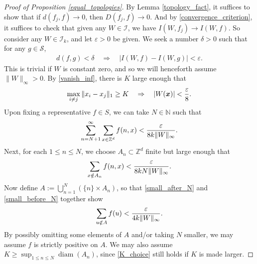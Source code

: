 \documentclass[11pt,reqno]{amsart}
\numberwithin{equation}{section}
\theoremstyle{definition}
\begin{document}
\begin{proof}[Proof of Proposition \ref{equal_topologies}]
By Lemma \ref{topology_fact}, it suffices to show that if $d(f_j,f) \to 0$, then $D(f_j,f) \to 0$.
And by \eqref{convergence_criterion}, it suffices to check that given any $W \in {\mathcal{I}}$, we have
$I(W,f_j) \to I(W,f)$.
So consider any $W \in {\mathcal{I}}_k$, and let ${\varepsilon} > 0$ be given.
We seek a number $\delta > 0$ such that for any $g \in {\mathcal{S}}$,
{\begin{align*} {
d(f,g) < \delta \quad \Rightarrow \quad |I(W,f) - I(W,g)| < {\varepsilon}. 
} \end{align*}}
This is trivial if $W$ is constant zero, and so we will henceforth assume $\|W\|_\infty > 0$.
By \eqref{vanish_inf}, there is $K$ large enough that
{\begin{align} \begin{split} { \label{K_choice}
\max_{i \neq j} \|x_i - x_j\|_1 \geq K \quad \Rightarrow \quad |W({{\boldsymbol {x}}})| < \frac{\varepsilon}{8}.
} \end{split} \end{align}}
Upon fixing a representative $f \in S$, we can take $N \in {\mathbb{N}}$ such that
{\begin{align} \begin{split} { \label{small_after_N}
\sum_{n = N+1}^\infty \sum_{x \in {\mathbb{Z}}^d} f(n,x) < \frac{\varepsilon}{8k\|W\|_\infty}.
} \end{split} \end{align}} 
Next, for each $1 \leq n \leq N$, we choose $A_n \subset {\mathbb{Z}}^d$ finite but large enough that
{\begin{align} \begin{split} { \label{small_before_N}
\sum_{x \notin A_n} f(n,x) < \frac{\varepsilon}{8kN\|W\|_\infty}.
} \end{split} \end{align}}
Now define $A := \bigcup_{n = 1}^N (\{n\} \times A_n)$, so that \eqref{small_after_N} and \eqref{small_before_N} together show
{\begin{align} \begin{split} { \label{small_total}
\sum_{u \notin A} f(u) < \frac{\varepsilon}{4k\|W\|_\infty}.
} \end{split} \end{align}}
By possibly omitting some elements of $A$ and/or taking $N$ smaller, we may assume $f$ is strictly positive on $A$.
We may also assume $K \geq \sup_{1 \leq n \leq N} \operatorname{diam}(A_n)$, since \eqref{K_choice} still holds if $K$ is made larger.

\end{proof}
\end{document}
